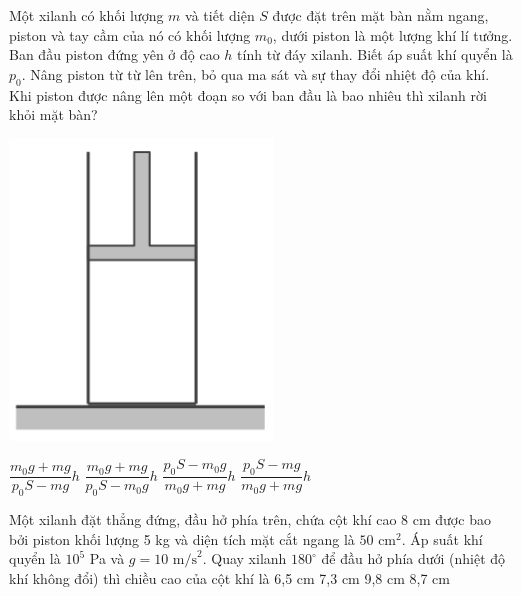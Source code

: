 \documentclass[12pt,a4paper]{article}
\begin{document}
\begin{ex}
	Một xilanh có khối lượng $m$ và tiết diện $S$ được đặt trên mặt bàn nằm ngang, piston và tay cầm của nó có khối lượng $m_0$, dưới piston là một lượng khí lí tưởng. Ban đầu piston đứng yên ở độ cao $h$ tính từ đáy xilanh. Biết áp suất khí quyển là $p_0$. Nâng piston từ từ lên trên, bỏ qua ma sát và sự thay đổi nhiệt độ của khí. Khi piston được nâng lên một đoạn so với ban đầu là bao nhiêu thì xilanh rời khỏi mặt bàn?
		\begin{center}
		\includegraphics[scale=0.3]{img/5.png}
	\end{center}
	\choice
	{$\dfrac{m_0g+mg}{p_0S-mg}h$}
	{$\dfrac{m_0g+mg}{p_0S-m_0g}h$}
	{$\dfrac{p_0S-m_0g}{m_0g+mg}h$}
	{$\dfrac{p_0S-mg}{m_0g+mg}h$}
\end{ex}

\begin{ex}
	Một xilanh đặt thẳng đứng, đầu hở phía trên, chứa cột khí cao 8 cm được bao bởi piston khối lượng 5 kg và diện tích mặt cắt ngang là $50 \text{ cm}^2$. Áp suất khí quyển là $10^5$ Pa và $g=10 \text{ m/s}^2$. Quay xilanh $180^\circ$ để đầu hở phía dưới (nhiệt độ khí không đổi) thì chiều cao của cột khí là
	\choice
	{6,5 cm}
	{7,3 cm}
	{9,8 cm}
	{8,7 cm}
\end{ex}
\end{document}
